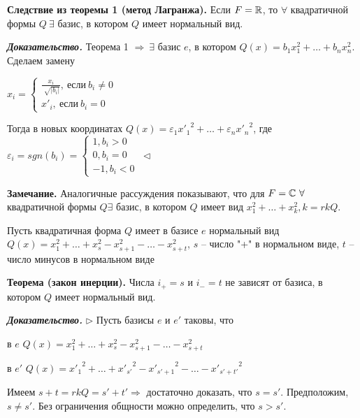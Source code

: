 \vspace{\baselineskip}
\textbf{Следствие из теоремы 1 (метод Лагранжа).} Если $F = \mathbb{R}$, то $\forall$ квадратичной формы $Q \ \exists$ базис, в котором $Q$ имеет нормальный вид.

\vspace{\baselineskip}
\textbf{\textit{Доказательство.}} Теорема 1 $\Rightarrow \ \exists$ базис $e$, в котором $Q(x) = b_1 x_1^2 + \dots + b_n x_n^2$. Сделаем замену

$ x_i = \begin{cases}
		\frac{x_i}{\sqrt[]{|b_i|}}, \ если \ b_i \neq 0 \\
		x'_i, \ если \ b_i = 0
	\end{cases}$

Тогда в новых координатах $Q(x) = \varepsilon_1 {x'_1}^2 + \dots + \varepsilon_n {x'_n}^2$, где $\varepsilon_i = sgn(b_i) = \begin{cases}
		1, b_i > 0 \\
		0, b_i = 0 \\
        -1, b_i < 0 
	\end{cases} \ \lhd$
    

\vspace{\baselineskip}
\textbf{Замечание.} Аналогичные рассуждения показывают, что для $F = \mathbb{C} \ \forall$ квадратичной формы $Q \exists$ базис, в котором $Q$ имеет вид $x_1^2 + \dots + x_k^2, k = rkQ$.

\vspace{\baselineskip}
Пусть квадратичная форма $Q$ имеет в базисе $e$ нормальный вид $Q(x) = x_1^2 + \dots + x_s^2 - x_{s+1}^2 - \dots - x_{s+t}^2$, $s$ -- число "+" в нормальном виде, $t$ -- число минусов в нормальном виде

\vspace{\baselineskip}
\textbf{Теорема (закон инерции).} Числа $i_+ = s$ и $i_- = t$ не зависят от базиса, в котором $Q$ имеет нормальный вид.

\vspace{\baselineskip}
\textbf{\textit{Доказательство.}} $\rhd$ Пусть базисы $e$ и $e'$ таковы, что 

в $e$ $Q(x) = x_1^2 + \dots + x_s^2 - x_{s+1}^2 - \dots - x_{s+t}^2$

в $e'$ $Q(x) = {x'_1}^2 + \dots + {x'_{s'}}^2 - {x'_{s'+1}}^2 - \dots - {x'_{s'+ t'}}^2$

Имеем $s + t = rkQ = s' + t' \Rightarrow$ достаточно доказать, что $s = s'$. Предположим, $s \neq s'$. Без ограничения общности можно определить, что $s > s'$.

